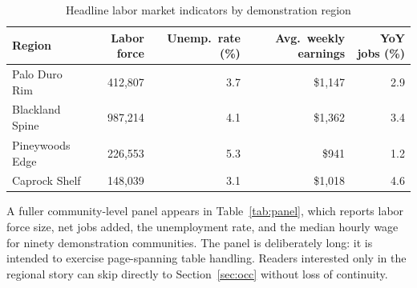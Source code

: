 \documentclass[11pt]{article}
\begin{document}
\begin{table}[htbp]
\centering
\caption{Headline labor market indicators by demonstration region}
\label{tab:headline}
\begin{tabular}{@{}lrrrr@{}}
\toprule
Region & Labor force & Unemp.\ rate (\%) & Avg.\ weekly earnings & YoY jobs (\%) \\
\midrule
Palo Duro Rim    & 412{,}807 & 3.7 & \$1{,}147 & 2.9 \\
Blackland Spine  & 987{,}214 & 4.1 & \$1{,}362 & 3.4 \\
Pineywoods Edge  & 226{,}553 & 5.3 & \$941     & 1.2 \\
Caprock Shelf    & 148{,}039 & 3.1 & \$1{,}018 & 4.6 \\
\bottomrule
\end{tabular}
\end{table}

A fuller community-level panel appears in Table~\ref{tab:panel}, which reports
labor force size, net jobs added, the unemployment rate, and the median hourly
wage for ninety demonstration communities. The panel is deliberately long: it
is intended to exercise page-spanning table handling. Readers interested only
in the regional story can skip directly to Section~\ref{sec:occ} without loss
of continuity.
\end{document}

